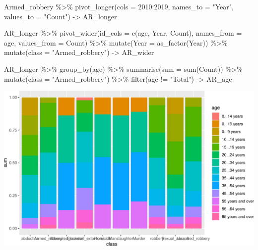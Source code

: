 \documentclass[11pt,a4paper,]{article}
\newenvironment{Shaded}{\begin{snugshade}}{\end{snugshade}}
\newcommand{\AttributeTok}[1]{\textcolor[rgb]{0.77,0.63,0.00}{#1}}
\newcommand{\FunctionTok}[1]{\textcolor[rgb]{0.00,0.00,0.00}{#1}}
\newcommand{\NormalTok}[1]{#1}
\newcommand{\OtherTok}[1]{\textcolor[rgb]{0.56,0.35,0.01}{#1}}
\newcommand{\SpecialCharTok}[1]{\textcolor[rgb]{0.00,0.00,0.00}{#1}}
\newcommand{\StringTok}[1]{\textcolor[rgb]{0.31,0.60,0.02}{#1}}
\begin{document}
\begin{Shaded}
\begin{Highlighting}[]
\NormalTok{Armed\_robbery }\SpecialCharTok{\%\textgreater{}\%}
  \FunctionTok{pivot\_longer}\NormalTok{(}\AttributeTok{cols =} \StringTok{\textquotesingle{}2010\textquotesingle{}}\SpecialCharTok{:}\StringTok{\textquotesingle{}2019\textquotesingle{}}\NormalTok{,  }
                \AttributeTok{names\_to =} \StringTok{"Year"}\NormalTok{,            }
                \AttributeTok{values\_to =} \StringTok{"Count"}\NormalTok{) }\OtherTok{{-}\textgreater{}}\NormalTok{ AR\_longer}

\NormalTok{AR\_longer }\SpecialCharTok{\%\textgreater{}\%}
  \FunctionTok{pivot\_wider}\NormalTok{(}\AttributeTok{id\_cols =} \FunctionTok{c}\NormalTok{(age, Year, Count), }\AttributeTok{names\_from =}\NormalTok{ age, }\AttributeTok{values\_from =}\NormalTok{ Count) }\SpecialCharTok{\%\textgreater{}\%}
  \FunctionTok{mutate}\NormalTok{(}\AttributeTok{Year =} \FunctionTok{as\_factor}\NormalTok{(Year)) }\SpecialCharTok{\%\textgreater{}\%}
  \FunctionTok{mutate}\NormalTok{(}\AttributeTok{class =} \StringTok{"Armed\_robbery"}\NormalTok{) }\OtherTok{{-}\textgreater{}}\NormalTok{ AR\_wider}


\NormalTok{AR\_longer }\SpecialCharTok{\%\textgreater{}\%}
  \FunctionTok{group\_by}\NormalTok{(age) }\SpecialCharTok{\%\textgreater{}\%}
  \FunctionTok{summarise}\NormalTok{(}\AttributeTok{sum =} \FunctionTok{sum}\NormalTok{(Count)) }\SpecialCharTok{\%\textgreater{}\%}
  \FunctionTok{mutate}\NormalTok{(}\AttributeTok{class =} \StringTok{"Armed\_robbery"}\NormalTok{) }\SpecialCharTok{\%\textgreater{}\%}
  \FunctionTok{filter}\NormalTok{(age }\SpecialCharTok{!=} \StringTok{"Total"}\NormalTok{) }\OtherTok{{-}\textgreater{}}\NormalTok{ AR\_age}
\end{Highlighting}
\end{Shaded}

\begin{center}\includegraphics[width=0.5\linewidth]{report_files/figure-latex/graph-1} \end{center}
\end{document}
